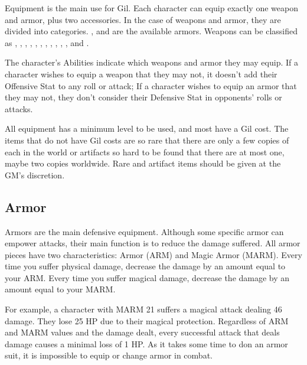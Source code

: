 \begin{multicols}{2}

Equipment is the main use for Gil. Each character can equip exactly one weapon and armor, plus two accessories. In the case of weapons and armor, they are divided into categories. ,  and  are the available armors. Weapons can be classified as , , , , , , , , , , , and .

The character’s Abilities indicate which weapons and armor they may equip. If a character wishes to equip a weapon that they may not, it doesn’t add their Offensive Stat to any roll or attack; If a character wishes to equip an armor that they may not, they don’t consider their Defensive Stat in opponents’ rolls or attacks.

All equipment has a minimum level to be used, and most have a Gil cost. The items that do not have Gil costs are so rare that there are only a few copies of each in the world or artifacts so hard to be found that there are at most one, maybe two copies worldwide. Rare and artifact items should be given at the GM’s discretion.

\subsection{Armor}\label{subsec:inv-armor}

Armors are the main defensive equipment. Although some specific armor can empower attacks, their main function is to reduce the damage suffered. All armor pieces have two characteristics: Armor (ARM) and Magic Armor (MARM). Every time you suffer physical damage, decrease the damage by an amount equal to your ARM\@. Every time you suffer magical damage, decrease the damage by an amount equal to your MARM\@. 

\begin{boco}
    For example, a character with MARM 21 suffers a magical attack dealing 46 damage. They lose 25 HP due to their magical protection. Regardless of ARM and MARM values and the damage dealt, every successful attack that deals damage causes a minimal loss of 1 HP\@. As it takes some time to don an armor suit, it is impossible to equip or change armor in combat.
\end{boco}


\end{multicols}
